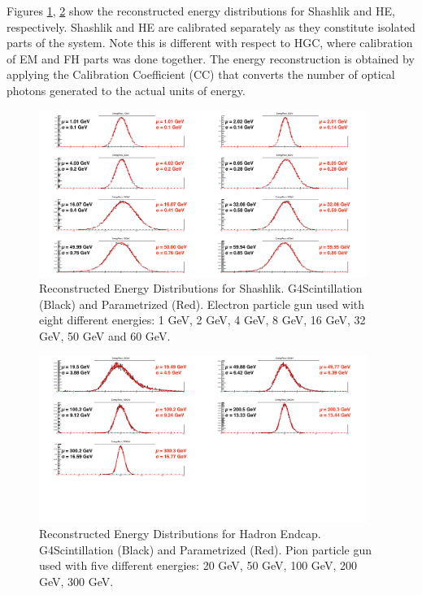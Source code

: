 Figures \ref{fig:simulations_shashlik_energyreco}, \ref{fig:simulations_he_energyreco} show the reconstructed energy distributions for Shashlik and HE, respectively. Shashlik and HE are calibrated separately as they constitute isolated parts of the system. Note this is different with respect to HGC, where calibration of EM and FH parts was done together. The energy reconstruction is obtained by applying the Calibration Coefficient (CC) that converts the number of optical photons generated to the actual units of energy.
\begin{figure}[hbtp]
    \centering
    \includegraphics[width=0.95\textwidth]{figures/ch_simulations/shashlik/performance/EnergyRecoDistributions.png}
    \caption{Reconstructed Energy Distributions for Shashlik. G4Scintillation (Black) and Parametrized (Red). Electron particle gun used with eight different energies: 1 GeV, 2 GeV, 4 GeV, 8 GeV, 16 GeV, 32 GeV, 50 GeV and 60 GeV.}
    \label{fig:simulations_shashlik_energyreco}
 \end{figure}
 \begin{figure}[hbtp]
    \centering
    \includegraphics[width=0.95\textwidth]{figures/ch_simulations/he/performance/EnergyRECODistributions.png}
    \caption{Reconstructed Energy Distributions for Hadron Endcap. G4Scintillation (Black) and Parametrized (Red). Pion particle gun used with five different energies:  20 GeV, 50 GeV, 100 GeV, 200 GeV, 300 GeV.}
    \label{fig:simulations_he_energyreco}
 \end{figure}

